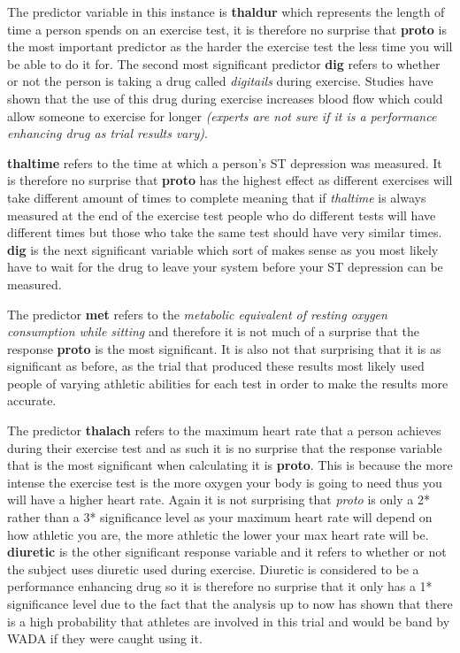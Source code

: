 \documentclass[a4paper]{article}
\begin{document}
\newpage

The predictor variable in this instance is \textbf{thaldur} which represents the
length of time a person spends on an exercise test, it is therefore no surprise
that \textbf{proto} is the most important predictor as the harder the exercise
test the less time you will be able to do it for. The second most significant
predictor \textbf{dig} refers to whether or not the person is taking a drug
called \textit{digitails} during exercise. Studies have shown that the use of
this drug during exercise increases blood flow which could allow someone to
exercise for longer \textit{(experts are not sure if it is a performance
enhancing drug as trial results vary)}.

\newpage

\textbf{thaltime} refers to the time at which a person's ST depression was
measured. It is therefore no surprise that \textbf{proto} has the highest effect
as different exercises will take different amount of times to complete meaning
that if \textit{thaltime} is always measured at the end of the exercise test
people who do different tests will have different times but those who take the
same test should have very similar times.  \textbf{dig} is the next significant
variable which sort of makes sense as you most likely have to wait for the drug
to leave your system before your ST depression can be measured.

\newpage

The predictor \textbf{met} refers to the \textit{metabolic equivalent of resting
oxygen consumption while sitting} and therefore it is not much of a surprise
that the response \textbf{proto} is the most significant. It is also not that
surprising that it is as significant as before, as the trial that produced these
results most likely used people of varying athletic abilities for each test
in order to make the results more accurate.

\newpage

The predictor \textbf{thalach} refers to the maximum heart rate that a person
achieves during their exercise test and as such it is no surprise that the
response variable that is the most significant when calculating it is
\textbf{proto}. This is because the more intense the exercise test is the more
oxygen your body is going to need thus you will have a higher heart rate. Again
it is not surprising that \textit{proto} is only a 2* rather than a 3*
significance level as your maximum heart rate will depend on how athletic you
are, the more athletic the lower your max heart rate will be. \textbf{diuretic}
is the other significant response variable and it refers to whether or not the
subject uses diuretic used during exercise. Diuretic is considered to be a
performance enhancing drug so it is therefore no surprise that it only has a 1*
significance level due to the fact that the analysis up to now has shown that
there is a high probability that athletes are involved in this trial and would
be band by WADA if they were caught using it.
\end{document}

